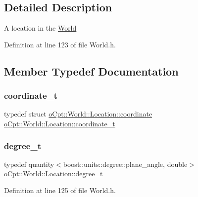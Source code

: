 \subsection{Detailed Description}
A location in the \hyperlink{classo_cpt_1_1_world}{World} 

Definition at line 123 of file World.\+h.



\subsection{Member Typedef Documentation}
\hypertarget{classo_cpt_1_1_world_1_1_location_ade9263a17c41b7af085dfcb9055b18f3}{}\label{classo_cpt_1_1_world_1_1_location_ade9263a17c41b7af085dfcb9055b18f3} 
\subsubsection{\texorpdfstring{coordinate\+\_\+t}{coordinate\_t}}
{\footnotesize\ttfamily typedef struct \hyperlink{structo_cpt_1_1_world_1_1_location_1_1coordinate}{o\+Cpt\+::\+World\+::\+Location\+::coordinate}  \hyperlink{classo_cpt_1_1_world_1_1_location_ade9263a17c41b7af085dfcb9055b18f3}{o\+Cpt\+::\+World\+::\+Location\+::coordinate\+\_\+t}}

\hypertarget{classo_cpt_1_1_world_1_1_location_a896d36a393f64f80cb4756134477da14}{}\label{classo_cpt_1_1_world_1_1_location_a896d36a393f64f80cb4756134477da14} 
\subsubsection{\texorpdfstring{degree\+\_\+t}{degree\_t}}
{\footnotesize\ttfamily typedef quantity$<$boost\+::units\+::degree\+::plane\+\_\+angle, double$>$ \hyperlink{classo_cpt_1_1_world_1_1_location_a896d36a393f64f80cb4756134477da14}{o\+Cpt\+::\+World\+::\+Location\+::degree\+\_\+t}}



Definition at line 125 of file World.\+h.

\hypertarget{classo_cpt_1_1_world_1_1_location_a3aa5e31e2888b4da40ad534b99473888}{}\label{classo_cpt_1_1_world_1_1_location_a3aa5e31e2888b4da40ad534b99473888} 
